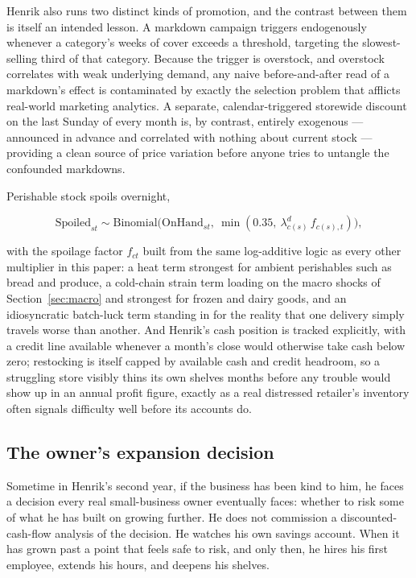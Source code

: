 \documentclass[12pt,a4paper]{article}
\begin{document}
Henrik also runs two distinct kinds of promotion, and the contrast
between them is itself an intended lesson. A markdown campaign triggers
endogenously whenever a category's weeks of cover exceeds a threshold,
targeting the slowest-selling third of that category. Because the
trigger is overstock, and overstock correlates with weak underlying
demand, any naive before-and-after read of a markdown's effect is
contaminated by exactly the selection problem that afflicts real-world
marketing analytics. A separate, calendar-triggered storewide discount
on the last Sunday of every month is, by contrast, entirely exogenous ---
announced in advance and correlated with nothing about current stock ---
providing a clean source of price variation before anyone tries to
untangle the confounded markdowns.

Perishable stock spoils overnight,

\[
\text{Spoiled}_{st} \sim \text{Binomial}\big(\text{OnHand}_{st},\
\min(0.35,\ \lambda^d_{c(s)}\,f_{c(s),t})\big) ,
\]

with the spoilage factor $f_{ct}$
built from the same log-additive logic as every other multiplier in this
paper: a heat term strongest for ambient perishables such as bread and
produce, a cold-chain strain term loading on the macro shocks of
Section~\ref{sec:macro} and strongest for frozen and dairy goods, and an
idiosyncratic batch-luck term standing in for the reality that one
delivery simply travels worse than another. And Henrik's cash position
is tracked explicitly, with a credit line available whenever a month's
close would otherwise take cash below zero; restocking is itself capped
by available cash and credit headroom, so a struggling store visibly
thins its own shelves months before any trouble would show up in an
annual profit figure, exactly as a real distressed retailer's inventory
often signals difficulty well before its accounts do.

\subsection{The owner's expansion decision}
\label{sec:micro-expansion}

Sometime in Henrik's second year, if the business has been kind to him,
he faces a decision every real small-business owner eventually faces:
whether to risk some of what he has built on growing further. He does
not commission a discounted-cash-flow analysis of the decision. He
watches his own savings account. When it has grown past a point that
feels safe to risk, and only then, he hires his first employee, extends
his hours, and deepens his shelves.
\end{document}
